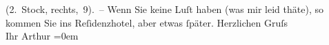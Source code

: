 \begin{ledgroupsized}[t]{13cm}
                    (2. Stock,  rechts, 9). – Wenn Sie keine
                        {\pb}Luſt haben (was mir leid thäte), so kommen Sie
                    ins Reſidenzhotel, aber etwas ſpäter.\pend
           \pstart
           Herzlichen Gruſs{\\[\baselineskip]}Ihr \spacefill\mbox{Arthur}\pend
           \leftskip=0em{}          \endnumbering{}\end{ledgroupsized}  \newcommand{\dateiname}{L00797}\newcommand{\titel}{Arthur Schnitzler an Hugo von Hofmannsthal, [29. 5. 1898?]}\newcommand{\editorInnen}{Martin Anton Müller und Gerd-Hermann Susen}
            \footnotesize
\begin{ledgroupsized}[t]{11.5cm}
\end{ledgroupsized}
         
      